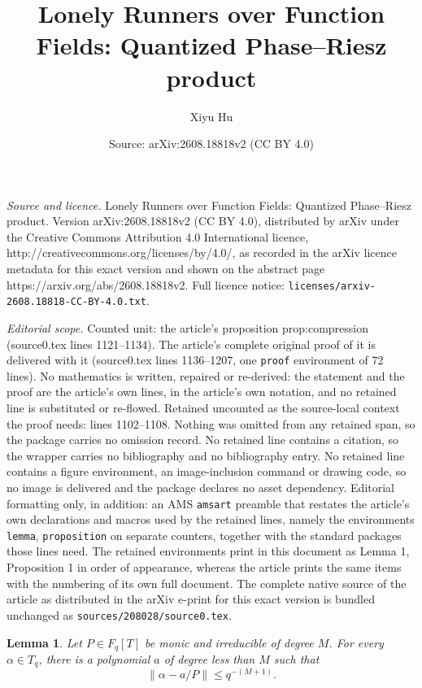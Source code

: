 \documentclass[10pt,a4paper]{amsart}
\title{Lonely Runners over Function Fields: Quantized Phase--Riesz product}
\author{Xiyu Hu}
\date{Source: arXiv:2608.18818v2 (CC BY 4.0)}
\newtheorem{lemma}{Lemma}
\newcommand{\Fq}{\mathbb F_q}
\newcommand{\Torus}{\mathbb T_q}
\def\mathbb#1{#1}%
\newcommand{\norm}[1]{\lVert#1\rVert}
\begin{document}
\maketitle

\noindent\emph{Source and licence.} Lonely Runners over Function Fields: Quantized Phase--Riesz product. Version arXiv:2608.18818v2 (CC BY 4.0), distributed by arXiv under the Creative Commons Attribution 4.0 International licence, http://creativecommons.org/licenses/by/4.0/, as recorded in the arXiv licence metadata for this exact version and shown on the abstract page https://arxiv.org/abs/2608.18818v2. Full licence notice: \texttt{licenses/arxiv-2608.18818-CC-BY-4.0.txt}.\par\smallskip

\noindent\textit{Editorial scope.} Counted unit: the article's proposition prop:compression (source0.tex lines 1121--1134). The article's complete original proof of it is delivered with it (source0.tex lines 1136--1207, one \texttt{proof} environment of 72 lines). No mathematics is written, repaired or re-derived: the statement and the proof are the article's own lines, in the article's own notation, and no retained line is substituted or re-flowed.  Retained uncounted as the source-local context the proof needs: lines 1102--1108.  Nothing was omitted from any retained span, so the package carries no omission record.  No retained line contains a citation, so the wrapper carries no bibliography and no bibliography entry.  No retained line contains a figure environment, an image-inclusion command or drawing code, so no image is delivered and the package declares no asset dependency.  Editorial formatting only, in addition: an AMS \texttt{amsart} preamble that restates the article's own declarations and macros used by the retained lines, namely the environments \texttt{lemma}, \texttt{proposition} on separate counters, together with the standard packages those lines need.  The retained environments print in this document as Lemma 1, Proposition 1 in order of appearance, whereas the article prints the same items with the numbering of its own full document.  The complete native source of the article as distributed in the arXiv e-print for this exact version is bundled unchanged as \texttt{sources/208028/source0.tex}.
\begin{lemma}\label{lem:rational-approx}
Let $P\in\Fq[T]$ be monic and irreducible of degree $M$.  For every
$\alpha\in\Torus$, there is a polynomial $a$ of degree less than $M$ such that
\begin{equation}\label{eq:rational-approx}
 \norm{\alpha-a/P}\le q^{-(M+1)}.
\end{equation}
\end{lemma}
\end{document}
